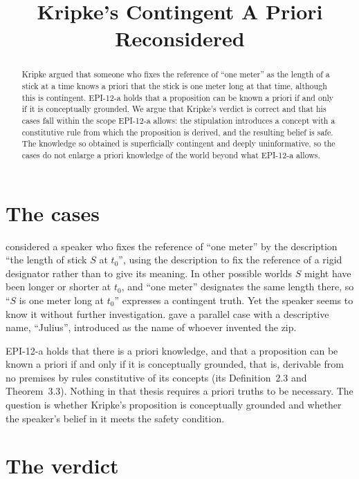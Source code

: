 \documentclass{situationist-preprint}
\title{Kripke's Contingent A Priori Reconsidered}
\begin{document}
\maketitle

\begin{abstract}
Kripke argued that someone who fixes the reference of \enquote{one meter} as the length of a stick at a time knows a priori that the stick is one meter long at that time, although this is contingent. EPI-12-a holds that a proposition can be known a priori if and only if it is conceptually grounded. We argue that Kripke's verdict is correct and that his cases fall within the scope EPI-12-a allows: the stipulation introduces a concept with a constitutive rule from which the proposition is derived, and the resulting belief is safe. The knowledge so obtained is superficially contingent and deeply uninformative, so the cases do not enlarge a priori knowledge of the world beyond what EPI-12-a allows.
\end{abstract}

\section{The cases}

\citet{Kripke1980} considered a speaker who fixes the reference of \enquote{one meter} by the description \enquote{the length of stick $S$ at $t_0$}, using the description to fix the reference of a rigid designator rather than to give its meaning. In other possible worlds $S$ might have been longer or shorter at $t_0$, and \enquote{one meter} designates the same length there, so \enquote{$S$ is one meter long at $t_0$} expresses a contingent truth. Yet the speaker seems to know it without further investigation. \citet{Evans1979} gave a parallel case with a descriptive name, \enquote{Julius}, introduced as the name of whoever invented the zip.

EPI-12-a holds that there is a priori knowledge, and that a proposition can be known a priori if and only if it is conceptually grounded, that is, derivable from no premises by rules constitutive of its concepts (its Definition~2.3 and Theorem~3.3). Nothing in that thesis requires a priori truths to be necessary. The question is whether Kripke's proposition is conceptually grounded and whether the speaker's belief in it meets the safety condition.

\section{The verdict}
\end{document}

